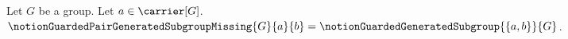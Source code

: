 

\begin{definition}\label{notion_guarded_pair_generated_subgroup_missing}
    Let $G$ be a group.
    Let $a\in\carrier[G]$.
    $\notionGuardedPairGeneratedSubgroupMissing{G}{a}{b}=
        \notionGuardedGeneratedSubgroup{\{a,b\}}{G}$.
\end{definition}
